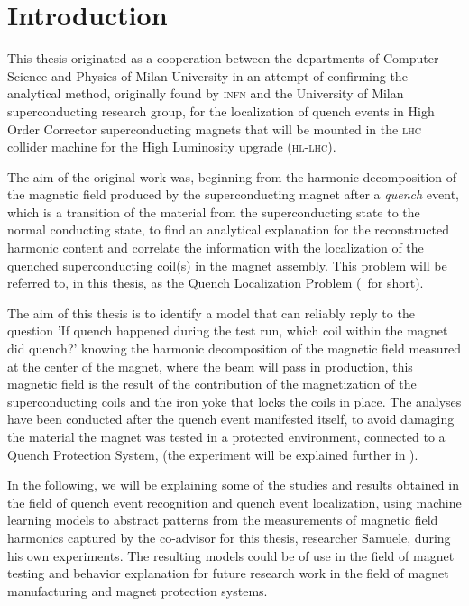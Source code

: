 \chapter{Introduction}
This thesis originated as a cooperation between the departments of Computer Science and Physics of
Milan University in an attempt of confirming the analytical method, originally found by
\textsc{infn} and the University of Milan superconducting research group, for the localization of
quench events in High Order Corrector superconducting magnets \cite{mariotto2022,
	mariotto2022-generic} that will be mounted in the \textsc{lhc} collider machine for the High
Luminosity upgrade \cite{rossi2024} (\textsc{hl-lhc}).

The aim of the original work was, beginning from the harmonic decomposition of the magnetic
field produced by the superconducting magnet after a \emph{quench} event, which is a transition of the
material from the superconducting state to the normal conducting state, to find an analytical
explanation for the reconstructed harmonic content and correlate the information with the
localization of the quenched superconducting coil(s) in the magnet assembly. This problem will be
referred to, in this thesis, as the Quench Localization Problem (\qlp\ for short).

The aim of this thesis is to identify a model that can reliably reply to the question 'If quench
happened during the test run, which coil within the magnet did quench?' knowing the harmonic
decomposition of the magnetic field measured at the center of the magnet, where the beam will pass
in production, this magnetic field is the result of the contribution of the magnetization of the
superconducting coils and the iron yoke that locks the coils in place. The analyses have been
conducted after the quench event manifested itself, to avoid damaging the material the magnet was
tested in a protected environment, connected to a Quench Protection System, (the experiment will be
explained further in ).

In the following, we will be explaining some of the studies and results obtained in the field of
quench event recognition and quench event localization, using machine learning models to abstract
patterns from the measurements of magnetic field harmonics captured by the co-advisor for this
thesis, researcher Samuele, during his own experiments. The resulting models could be of use in the
field of magnet testing and behavior explanation for future research work in the field of magnet
manufacturing and magnet protection systems.

